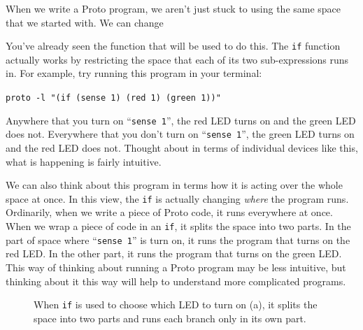 \documentclass{article}
\newcommand\code[1]{\begin{center}\var{#1}\end{center}}
\newcommand\var[1]{{\tt #1}}
\newcommand\qvar[1]{``{\tt #1}''}
\begin{document}
When we write a Proto program, we aren't just stuck to using the same
space that we started with.  We can change 

You've already seen the function that will be used to do this.  The
\var{if} function actually works by restricting the space that each of
its two sub-expressions runs in.  For example, try running this
program in your terminal:

\code{proto -l "(if (sense 1) (red 1) (green 1))"}

Anywhere that you turn on \qvar{sense 1}, the red LED turns on and the
green LED does not.  Everywhere that you don't turn on \qvar{sense 1},
the green LED turns on and the red LED does not.  Thought about in
terms of individual devices like this, what is happening is fairly
intuitive.

We can also think about this program in terms how it is acting over
the whole space at once.  In this view, the \var{if} is actually
changing {\em where} the program runs.  Ordinarily, when we write a
piece of Proto code, it runs everywhere at once.  When we wrap a piece
of code in an \var{if}, it splits the space into two parts.  In the
part of space where \qvar{sense 1} is turn on, it runs the program
that turns on the red LED.  In the other part, it runs the program
that turns on the green LED.  This way of thinking about running a
Proto program may be less intuitive, but thinking about it this way
will help to understand more complicated programs.

\begin{figure}[ht]
\centering
{}
\caption{When \var{if} is used to choose which LED to turn on (a), it
  splits the space into two parts and runs each branch only in its own
  part.}
\label{f:restriction}
\end{figure}
\end{document}
